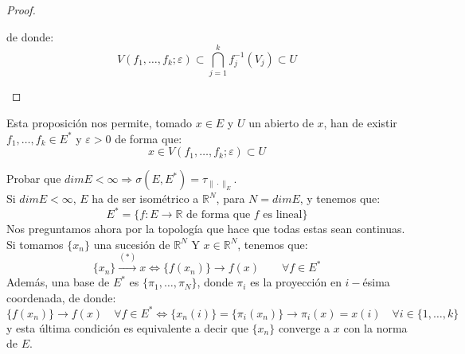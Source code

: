 \begin{prop}
\begin{proof}
\begin{enumerate}
                de donde:
                \begin{equation*}
                    V(f_1, \ldots, f_k;\varepsilon) \subset \bigcap_{j = 1}^k f_j^{-1}(V_j) \subset U
                \end{equation*}
        \end{enumerate}
    \end{proof}
\end{prop}

\noindent
Esta proposición nos permite, tomado $x\in E$ y $U$ un abierto de $x$, han de existir $f_1, \ldots, f_k\in E^\ast$ y $\varepsilon>0$ de forma que:
\begin{equation*}
    x\in V(f_1, \ldots, f_k;\varepsilon)\subset U
\end{equation*}

\begin{ejercicio} %
    Probar que $dim E < \infty \Longrightarrow \sigma(E,E^\ast) = \tau_{\|\cdot \|_E}$.\\

    \noindent
    Si $dim E < \infty$, $E$ ha de ser isométrico a $\mathbb{R}^N$, para $N = dim E$, y tenemos que:
    \begin{equation*}
        E^\ast = \{f:E\to \mathbb{R} \text{\ de forma que\ } f \text{\ es lineal}\}
    \end{equation*}
    Nos preguntamos ahora por la topología que hace que todas estas sean continuas. Si tomamos $\{x_n\}$ una sucesión de $\mathbb{R}^N$ Y $x\in \mathbb{R}^N$, tenemos que:
    \begin{equation*}
        \{x_n\} \stackrel{(\ast)}{\to} x \Longleftrightarrow \{f(x_n)\} \to f(x) \qquad \forall f\in E^\ast
    \end{equation*}
    Además, una base de $E^\ast$ es $\{\pi_1, \ldots, \pi_N\}$, donde $\pi_i$ es la proyección en $i-$ésima coordenada, de donde:
    \begin{equation*}
        \{f(x_n)\} \to f(x) \quad \forall f\in E^\ast \Longleftrightarrow \{x_n(i)\} =  \{\pi_i(x_n)\} \to \pi_i(x) = x(i) \quad \forall i \in \{1,\ldots, k\}
    \end{equation*}
    y esta última condición es equivalente a decir que $\{x_n\}$ converge a $x$ con la norma de $E$.
\end{ejercicio}

